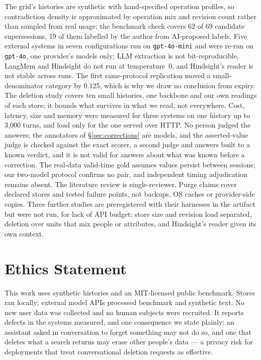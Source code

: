 \documentclass[conference]{IEEEtran}
\begin{document}
The grid's histories are synthetic with hand-specified operation profiles, so
contradiction density is approximated by operation mix and revision count rather
than sampled from real usage; the benchmark check covers 62 of 69 candidate
supersessions, 19 of them labelled by the author from AI-proposed labels. Five external systems in seven configurations
run on \texttt{gpt-4o-mini} and were re-run on \texttt{gpt-4o}, one provider's
models only; LLM extraction is not bit-reproducible, LangMem and Hindsight do not
run at temperature~0, and Hindsight's reader is not stable across runs. The
first same-protocol replication moved a small-denominator category by 0.125,
which is why we draw no conclusion from expiry. The deletion study covers ten
small histories, one backbone and our own readings of each store; it bounds
what survives in what we read, not everywhere. Cost, latency, size and memory were measured
for three systems on one history up to 3{,}000 turns, and load only for the one
served over HTTP. No person
judged the answers; the annotators of \S\ref{sec:corrections} are models, and the asserted-value judge is checked against the exact
scorer, a second judge and answers built to a known verdict, and it is not valid
for answers about what was known before a correction. The real-data valid-time
gold assumes values persist between sessions; our two-model protocol
confirms no pair, and independent timing adjudication remains absent. The literature review is single-reviewer. Purge claims cover declared
stores and tested failure points, not backups, OS caches or provider-side
copies. Three further studies are preregistered with their harnesses in the
artifact but were not run, for lack of API budget: store size and revision load
separated, deletion over units that mix people or attributes, and Hindsight's
reader given its own context.

\section*{Ethics Statement}

This work uses synthetic histories and an MIT-licensed public benchmark.
Stores ran locally; external model APIs processed benchmark and synthetic
text. No new user data was collected and no human subjects were recruited. It reports defects in the systems measured, and one
consequence we state plainly: an assistant asked in conversation to forget
something may not do so, and one that deletes what a search returns may erase
other people's data --- a privacy risk for deployments that treat conversational
deletion requests as effective.
\end{document}
